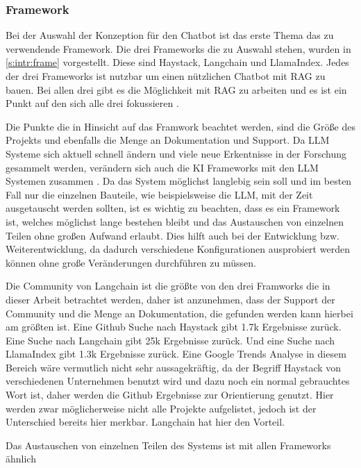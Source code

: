 \subsubsection{Framework}
\label{s:konz:frame}
Bei der Auswahl der Konzeption für den Chatbot ist das erste Thema das zu verwendende Framework.
Die drei Frameworks die zu Auswahl stehen, wurden in \ref*{s:intr:frame} vorgestellt.
Diese sind Haystack, Langchain und LlamaIndex. Jedes 
der drei Frameworks ist nutzbar um einen nützlichen Chatbot mit RAG zu bauen. 
Bei allen drei gibt es die Möglichkeit mit RAG zu arbeiten und es ist ein Punkt
auf den sich alle drei fokussieren \cite{WhatHaystack, LlamaIndexLlamaIndex, IntroductionLangChain}. \par 
Die Punkte die in Hinsicht auf das Framwork beachtet 
werden, sind die Größe des Projekts und ebenfalls die Menge an Dokumentation und Support.
Da LLM Systeme sich aktuell schnell ändern und viele neue Erkentnisse 
in der Forschung gesammelt werden, verändern sich auch die KI Frameworks mit den 
LLM Systemen zusammen \cite{naveedComprehensiveOverviewLarge2024}. Da das System möglichst 
langlebig sein soll und im besten Fall nur die einzelnen Bauteile, wie beispielsweise die 
LLM, mit der Zeit ausgetauscht werden sollten, ist es wichtig zu beachten, dass es ein 
Framework ist, welches möglichst lange bestehen bleibt und das Austauschen von einzelnen 
Teilen ohne großen Aufwand erlaubt. Dies hilft auch bei der Entwicklung bzw. Weiterentwicklung, 
da dadurch verschiedene Konfigurationen ausprobiert werden können ohne große Veränderungen
durchführen zu müssen. \par
 Die Community von Langchain ist die größte von den 
drei Framworks die in dieser Arbeit betrachtet werden, daher ist anzunehmen, dass der 
Support der Community und die Menge an Dokumentation, die gefunden werden
kann hierbei am größten ist. Eine Github Suche nach Haystack gibt 1.7k Ergebnisse zurück. 
Eine Suche nach Langchain gibt 25k Ergebnisse zurück. Und eine Suche nach LlamaIndex gibt 
1.3k Ergebnisse zurück. Eine Google Trends Analyse in diesem Bereich wäre vermutlich nicht
sehr aussagekräftig, da der Begriff Haystack von verschiedenen Unternehmen benutzt wird 
und dazu noch ein normal gebrauchtes Wort ist, daher werden die Github Ergebnisse
zur Orientierung genutzt. Hier werden zwar möglicherweise nicht alle Projekte aufgelistet, jedoch 
ist der Unterschied bereits hier merkbar. Langchain hat hier den Vorteil. \par
Das Austauschen von einzelnen Teilen des Systems ist mit allen Frameworks ähnlich 
